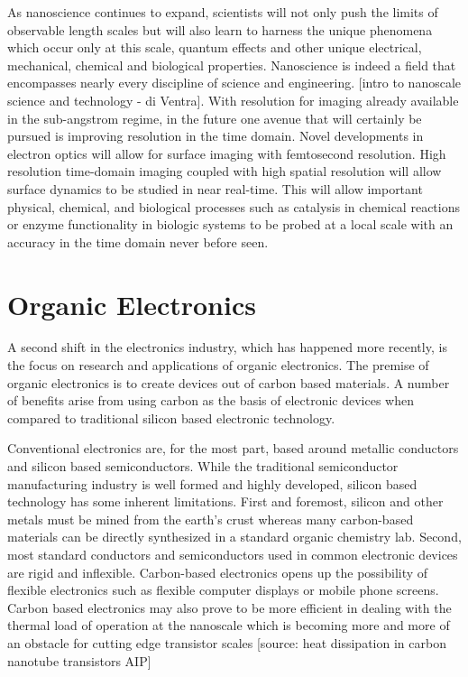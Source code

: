 As nanoscience continues to expand, scientists will not only push the limits of observable length scales but will also learn to harness the unique phenomena which occur only at this scale, quantum effects and other unique electrical, mechanical, chemical and biological properties. Nanoscience is indeed a field that encompasses nearly every discipline of science and engineering. [intro to nanoscale science and technology - di Ventra]. With resolution for imaging already available in the sub-angstrom regime, in the future one avenue that will certainly be pursued is improving resolution in the time domain. Novel developments in electron optics will allow for surface imaging with femtosecond resolution. High resolution time-domain imaging coupled with high spatial resolution will allow surface dynamics to be studied in near real-time. This will allow important physical, chemical, and biological processes such as catalysis in chemical reactions or enzyme functionality in biologic systems to be probed at a local scale with an accuracy in the time domain never before seen.

\section{Organic Electronics}
A second shift in the electronics industry, which has happened more recently, is the focus on research and applications of organic electronics. The premise of organic electronics is to create devices out of carbon based materials. A number of benefits arise from using carbon as the basis of electronic devices when compared to traditional silicon based electronic technology.

Conventional electronics are, for the most part, based around metallic conductors and silicon based semiconductors. While the traditional semiconductor manufacturing industry is well formed and highly developed, silicon based technology has some inherent limitations. First and foremost, silicon and other metals must be mined from the earth's crust whereas many carbon-based materials can be directly synthesized in a standard organic chemistry lab.  Second, most standard conductors and semiconductors used in common electronic devices are rigid and inflexible. Carbon-based electronics opens up the possibility of flexible electronics such as flexible computer displays or mobile phone screens. Carbon based electronics may also prove to be more efficient in dealing with the thermal load of operation at the nanoscale which is becoming more and more of an obstacle for cutting edge transistor scales [source: heat dissipation in carbon nanotube transistors AIP]

